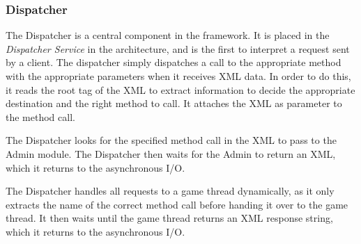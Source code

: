 \subsubsection{Dispatcher}\label{subsec:dispatcherdesign}
The Dispatcher is a central component in the framework. It is placed in the \textit{Dispatcher Service} in the architecture, and is the first to interpret a request sent by a client. The dispatcher simply dispatches a call to the appropriate method with the appropriate parameters when it receives XML data. In order to do this, it reads the root tag of the XML to extract information to decide the appropriate destination and the right method to call. It attaches the XML as parameter to the method call.

The Dispatcher looks for the specified method call in the XML to pass to the Admin module. The Dispatcher then waits for the Admin to return an XML, which it returns to the asynchronous I/O.

The Dispatcher handles all requests to a game thread dynamically, as it only extracts the name of the correct method call before handing it over to the game thread. It then waits until the game thread returns an XML response string, which it returns to the asynchronous I/O.